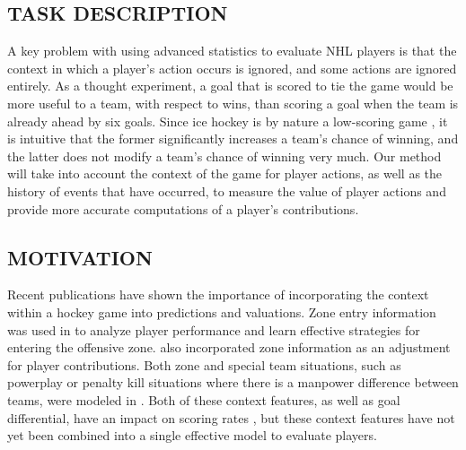 \documentclass[]{article}
\begin{document}

\subsection{TASK DESCRIPTION}

A key problem with using advanced statistics to evaluate NHL players is that the context in which a player's action occurs is ignored, and some actions are ignored entirely. As a thought experiment, a goal that is scored to tie the game would be more useful to a team, with respect to wins, than scoring a goal when the team is already ahead by six goals. Since ice hockey is by nature a low-scoring game \citep{Lock2009}, it is intuitive that the former significantly increases a team's chance of winning, and the latter does not modify a team's chance of winning very much. Our method will take into account the context of the game for player actions, as well as the history of events that have occurred, to measure the value of player actions and provide more accurate computations of a player's contributions.


\subsection{MOTIVATION}

Recent publications have shown the importance of incorporating the context within a hockey game into predictions and valuations. Zone entry information was used in \citep{Tulsky2013} to analyze player performance and learn effective strategies for entering the offensive zone. \citep{Schuckers2013} also incorporated zone information as an adjustment for player contributions. Both zone and special team situations, such as powerplay or penalty kill situations where there is a manpower difference between teams, were modeled in \citep{Macdonald2012}. Both of these context features, as well as goal differential, have an impact on scoring rates \citep{Thomas2013}, but these context features have not yet been combined into a single effective model to evaluate players.
\end{document}
